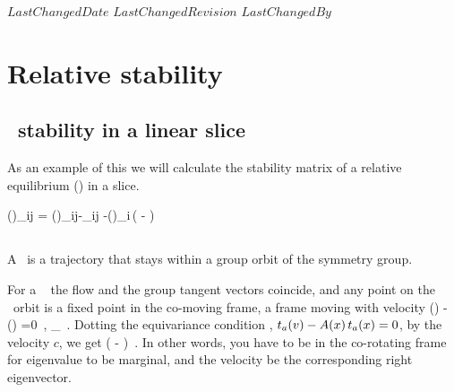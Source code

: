 
{$LastChangedDate$}
{$LastChangedRevision$} {$LastChangedBy$}


\section{Relative stability}
\label{sect:relStab}

\subsection{\Reqva\ stability in a linear slice}

As an example of this we will calculate the stability matrix of a
relative equilibrium () in a slice.


\beq
{\MvarRed}(\sspRed)_{ij} = \Mvar(\sspRed)_{ij}-\velRel \cdot \Lg_{ij}
     -\groupTan(\sspRed)_i\,\left(
     - \velRel {}
              \right)


\subsection{\Reqva}

A \reqv\ is a trajectory that stays
within a group orbit of the symmetry group.

For a \reqv\ \REQV{}{} the flow and the group tangent vectors coincide, and
any point on the \reqv\ orbit is a fixed point in the co-moving frame,
a frame moving with velocity
     \toCB
\beq
\vel(\ssp) - \velRel \cdot \groupTan(\ssp) =0
    \,,\qquad
\ssp \in \pS_{\REQV{}{}}
\,.
Dotting the equivariance condition , $ t_a(v)  - A(x) \, t_a(x) =0 $, by the velocity $c$, we get
\beq
( \Mvar -  \velRel \cdot \Lg) 
\,.
In other words, you have to be in the co-rotating
frame for eigenvalue to be marginal, and the velocity
be the corresponding right eigenvector.

